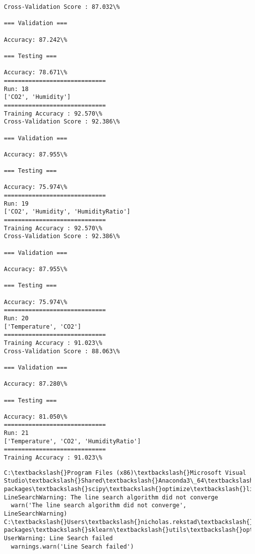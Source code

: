 \documentclass[11pt]{article}
\begin{document}
    \begin{Verbatim}[commandchars=\\\{\}]
Cross-Validation Score : 87.032\%

=== Validation ===

Accuracy: 87.242\%

=== Testing ===

Accuracy: 78.671\%
=============================
Run: 18
['CO2', 'Humidity']
=============================
Training Accuracy : 92.570\%
Cross-Validation Score : 92.386\%

=== Validation ===

Accuracy: 87.955\%

=== Testing ===

Accuracy: 75.974\%
=============================
Run: 19
['CO2', 'Humidity', 'HumidityRatio']
=============================
Training Accuracy : 92.570\%
Cross-Validation Score : 92.386\%

=== Validation ===

Accuracy: 87.955\%

=== Testing ===

Accuracy: 75.974\%
=============================
Run: 20
['Temperature', 'CO2']
=============================
Training Accuracy : 91.023\%
Cross-Validation Score : 88.063\%

=== Validation ===

Accuracy: 87.280\%

=== Testing ===

Accuracy: 81.050\%
=============================
Run: 21
['Temperature', 'CO2', 'HumidityRatio']
=============================
Training Accuracy : 91.023\%

    \end{Verbatim}

    \begin{Verbatim}[commandchars=\\\{\}]
C:\textbackslash{}Program Files (x86)\textbackslash{}Microsoft Visual Studio\textbackslash{}Shared\textbackslash{}Anaconda3\_64\textbackslash{}lib\textbackslash{}site-packages\textbackslash{}scipy\textbackslash{}optimize\textbackslash{}linesearch.py:313: LineSearchWarning: The line search algorithm did not converge
  warn('The line search algorithm did not converge', LineSearchWarning)
C:\textbackslash{}Users\textbackslash{}nicholas.rekstad\textbackslash{}AppData\textbackslash{}Roaming\textbackslash{}Python\textbackslash{}Python36\textbackslash{}site-packages\textbackslash{}sklearn\textbackslash{}utils\textbackslash{}optimize.py:195: UserWarning: Line Search failed
  warnings.warn('Line Search failed')

    \end{Verbatim}
\end{document}
